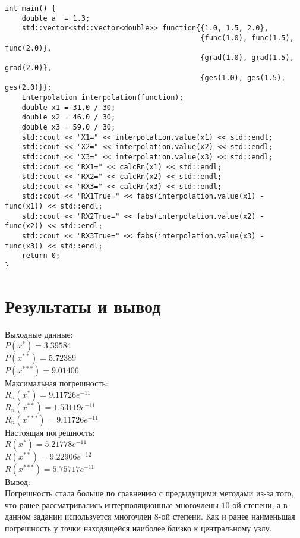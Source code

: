 \documentclass[10pt]{scrartcl}
\begin{document}
\begin{verbatim}
int main() {
    double a  = 1.3;
    std::vector<std::vector<double>> function{{1.0, 1.5, 2.0},
                                              {func(1.0), func(1.5), func(2.0)},
                                              {grad(1.0), grad(1.5), grad(2.0)},
                                              {ges(1.0), ges(1.5), ges(2.0)}};
    Interpolation interpolation(function);
    double x1 = 31.0 / 30;
    double x2 = 46.0 / 30;
    double x3 = 59.0 / 30;
    std::cout << "X1=" << interpolation.value(x1) << std::endl;
    std::cout << "X2=" << interpolation.value(x2) << std::endl;
    std::cout << "X3=" << interpolation.value(x3) << std::endl;
    std::cout << "RX1=" << calcRn(x1) << std::endl;
    std::cout << "RX2=" << calcRn(x2) << std::endl;
    std::cout << "RX3=" << calcRn(x3) << std::endl;
    std::cout << "RX1True=" << fabs(interpolation.value(x1) - func(x1)) << std::endl;
    std::cout << "RX2True=" << fabs(interpolation.value(x2) - func(x2)) << std::endl;
    std::cout << "RX3True=" << fabs(interpolation.value(x3) - func(x3)) << std::endl;
    return 0;
}
\end{verbatim}
\section*{Результаты и вывод}\noindent
Выходные данные:\\
$P(x^*)=3.39584$\\
$P(x^{**})=5.72389$\\
$P(x^{***})=9.01406$\\
Максимальная погрешность:\\
$R_n(x^*)=9.11726e^{-11}$\\
$R_n(x^{**})=1.53119e^{-11}$\\
$R_n(x^{***})=9.11726e^{-11}$\\
Настоящая погрешность:\\
$R(x^*)=5.21778e^{-11}$\\
$R(x^{**})=9.22906e^{-12}$\\
$R(x^{***})=5.75717e^{-11}$\\
Вывод:\\
Погрешность стала больше по сравнению с предыдущими методами из-за того, что ранее
рассматривались интерполяционные многочлены $10$-ой степени, а в данном задании 
используется многочлен $8$-ой степени. Как и ранее наименьшая погрешность у точки
находящейся наиболее близко к центральному узлу.
\end{document}
